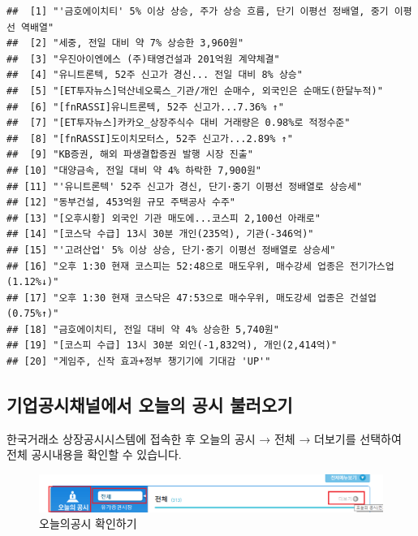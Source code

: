 \documentclass[]{book}
\begin{document}
\begin{verbatim}
##  [1] "'금호에이치티' 5% 이상 상승, 주가 상승 흐름, 단기 이평선 정배열, 중기 이평선 역배열"
##  [2] "세중, 전일 대비 약 7% 상승한 3,960원"                                               
##  [3] "우진아이엔에스 (주)태영건설과 201억원 계약체결"                                     
##  [4] "유니트론텍, 52주 신고가 경신... 전일 대비 8% 상승"                                  
##  [5] "[ET투자뉴스]덕산네오룩스_기관/개인 순매수, 외국인은 순매도(한달누적)"               
##  [6] "[fnRASSI]유니트론텍, 52주 신고가...7.36% ↑"                                        
##  [7] "[ET투자뉴스]카카오_상장주식수 대비 거래량은 0.98%로 적정수준"                       
##  [8] "[fnRASSI]도이치모터스, 52주 신고가...2.89% ↑"                                      
##  [9] "KB증권, 해외 파생결합증권 발행 시장 진출"                                           
## [10] "대양금속, 전일 대비 약 4% 하락한 7,900원"                                           
## [11] "'유니트론텍' 52주 신고가 경신, 단기·중기 이평선 정배열로 상승세"                   
## [12] "동부건설, 453억원 규모 주택공사 수주"                                               
## [13] "[오후시황] 외국인 기관 매도에...코스피 2,100선 아래로"                              
## [14] "[코스닥 수급] 13시 30분 개인(235억), 기관(-346억)"                                  
## [15] "'고려산업' 5% 이상 상승, 단기·중기 이평선 정배열로 상승세"                         
## [16] "오후 1:30 현재 코스피는 52:48으로 매도우위, 매수강세 업종은 전기가스업(1.12%↓)"    
## [17] "오후 1:30 현재 코스닥은 47:53으로 매수우위, 매도강세 업종은 건설업(0.75%↑)"        
## [18] "금호에이치티, 전일 대비 약 4% 상승한 5,740원"                                       
## [19] "[코스피 수급] 13시 30분 외인(-1,832억), 개인(2,414억)"                              
## [20] "게임주, 신작 효과+정부 챙기기에 기대감 'UP'"
\end{verbatim}

\hypertarget{section-15}{%
\subsection{기업공시채널에서 오늘의 공시 불러오기}\label{section-15}}

한국거래소 상장공시시스템에 접속한 후 오늘의 공시 → 전체 → 더보기를 선택하여 전체 공시내용을 확인할 수 있습니다.

\begin{figure}

{\centering \includegraphics{images/crawl_kind} 

}

\caption{오늘의공시 확인하기}\label{fig:unnamed-chunk-11}
\end{figure}
\end{document}
